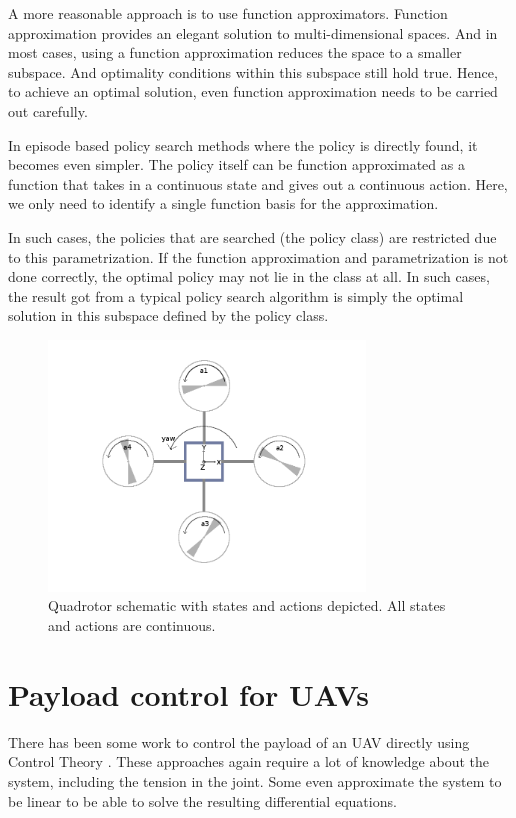 \documentclass[BTech]{iitmdiss}
\begin{document}
A more reasonable approach is to use function approximators. Function approximation provides an elegant solution to multi-dimensional spaces. And in most cases, using a function approximation reduces the space to a smaller subspace. And optimality conditions within this subspace still hold true. Hence, to achieve an optimal solution, even function approximation needs to be carried out carefully.

In episode based policy search methods where the policy is directly found, it becomes even simpler. The policy itself can be function approximated as a function that takes in a continuous state and gives out a continuous action. Here, we only need to identify a single function basis for the approximation.

In such cases, the policies that are searched (the policy class) are restricted due to this parametrization. If the function approximation and parametrization is not done correctly, the optimal policy may not lie in the class at all. In such cases, the result got from a typical policy search algorithm is simply the optimal solution in this subspace defined by the policy class.

\begin{figure}[h]
  \centering
    \includegraphics[width=0.75\textwidth]{quadrotor_states_actions.png}
    \caption{Quadrotor schematic with states and actions depicted. All states and actions are continuous.}
\end{figure}

\section{Payload control for UAVs}

There has been some work to control the payload of an UAV directly using Control Theory \cite{PayloadControlTheory,PayloadControlTheory2}. These approaches again require a lot of knowledge about the system, including the tension in the joint. Some even approximate the system to be linear to be able to solve the resulting differential equations.
\end{document}
